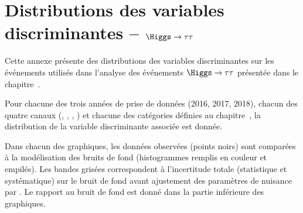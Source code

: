 \chapter{Distributions des variables discriminantes -- $\Higgs\to\tau\tau$}\label{annexe-discriminating_variables-HTT}

Cette annexe présente des distributions des variables discriminantes
sur les événements utilisés dans l'analyse des événements $\Higgs\to\tau\tau$
présentée dans le chapitre~.
\par
Pour chacune des trois années de prise de données (2016, 2017, 2018),
chacun des quatre canaux (\tauh\tauh, \mu\tauh, \ele\tauh, \ele\mu)
et
chacune des catégories définies au chapitre~,
la distribution de la variable discriminante associée est donnée.
\par
Dans chacun des graphiques,
les données observées (points noirs) sont comparées à la modélisation des bruits de fond (histogrammes remplis en couleur et empilés).
Les bandes grisées correspondent à l'incertitude totale (statistique et systématique) sur le bruit de fond
avant ajustement des paramètres de nuisance par \COMBINE.
Le rapport au bruit de fond est donné dans la partie inférieure des graphiques.


